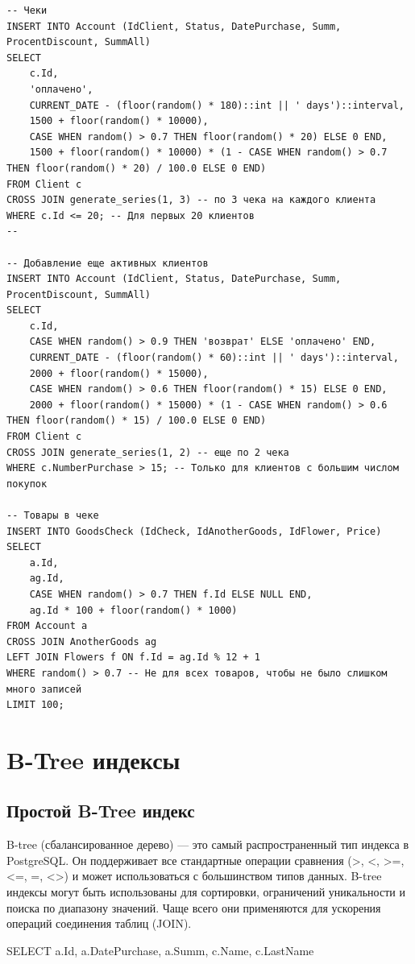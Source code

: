 \documentclass[bachelor, och, referat, times]{SCWorks}
\begin{document}
{\begin{verbatim}
-- Чеки
INSERT INTO Account (IdClient, Status, DatePurchase, Summ, ProcentDiscount, SummAll)
SELECT 
    c.Id,
    'оплачено',
    CURRENT_DATE - (floor(random() * 180)::int || ' days')::interval,
    1500 + floor(random() * 10000),
    CASE WHEN random() > 0.7 THEN floor(random() * 20) ELSE 0 END,
    1500 + floor(random() * 10000) * (1 - CASE WHEN random() > 0.7 THEN floor(random() * 20) / 100.0 ELSE 0 END)
FROM Client c
CROSS JOIN generate_series(1, 3) -- по 3 чека на каждого клиента
WHERE c.Id <= 20; -- Для первых 20 клиентов
--

-- Добавление еще активных клиентов
INSERT INTO Account (IdClient, Status, DatePurchase, Summ, ProcentDiscount, SummAll)
SELECT 
    c.Id,
    CASE WHEN random() > 0.9 THEN 'возврат' ELSE 'оплачено' END,
    CURRENT_DATE - (floor(random() * 60)::int || ' days')::interval,
    2000 + floor(random() * 15000),
    CASE WHEN random() > 0.6 THEN floor(random() * 15) ELSE 0 END,
    2000 + floor(random() * 15000) * (1 - CASE WHEN random() > 0.6 THEN floor(random() * 15) / 100.0 ELSE 0 END)
FROM Client c
CROSS JOIN generate_series(1, 2) -- еще по 2 чека
WHERE c.NumberPurchase > 15; -- Только для клиентов с большим числом покупок

-- Товары в чеке
INSERT INTO GoodsCheck (IdCheck, IdAnotherGoods, IdFlower, Price)
SELECT 
    a.Id,
    ag.Id,
    CASE WHEN random() > 0.7 THEN f.Id ELSE NULL END,
    ag.Id * 100 + floor(random() * 1000)
FROM Account a
CROSS JOIN AnotherGoods ag
LEFT JOIN Flowers f ON f.Id = ag.Id % 12 + 1
WHERE random() > 0.7 -- Не для всех товаров, чтобы не было слишком много записей
LIMIT 100;
\end{verbatim}
}

    \section{B-Tree индексы}
        \subsection{Простой B-Tree индекс}
B-tree (сбалансированное дерево) — это самый распространенный тип индекса в PostgreSQL. 
Он поддерживает все стандартные операции сравнения (>, <, >=, <=, =, <>) 
и может использоваться с большинством типов данных. B-tree индексы могут быть использованы 
для сортировки, ограничений уникальности и поиска по диапазону значений. 
Чаще всего они применяются для ускорения операций соединения таблиц (JOIN).


SELECT a.Id, a.DatePurchase, a.Summ, c.Name, c.LastName
\end{document}
